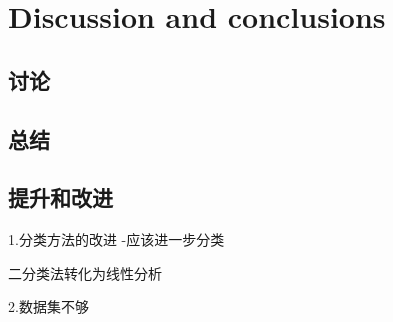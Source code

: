\section{Discussion and conclusions}
\label{sec:results}

\subsection{讨论}

\subsection{总结}


\subsection{提升和改进}

1.分类方法的改进 -应该进一步分类 

二分类法转化为线性分析

2.数据集不够




\FloatBarrier %